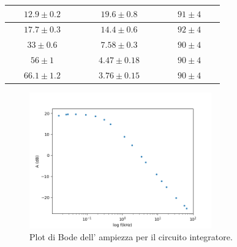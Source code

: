 \documentclass[10pt,a4paper]{article}
\newcommand{\exn}{\phantom{xxx}}
\begin{document}
\begin{table}[h]
\begin{tabular}{|c|c|c|}
				$\exn 12.9\pm 0.2 \exn $  & $\exn 19.6 \pm 0.8 \exn $ & $\exn 91 \pm  4\exn $ \\
				\hline
				$\exn 17.7\pm 0.3\exn $ & $\exn14.4\pm 0.6 \exn $ & $\exn 92\pm4\exn $ \\

				\hline
				$\exn 33\pm 0.6\exn $& $\exn7.58 \pm  0.3
   \exn $ & $\exn90 \pm 4 \exn $ \\
				\hline
				$\exn 56\pm 1 \exn $  & $\exn 4.47\pm0.18   \exn $ & $\exn 90\pm 4\exn $ \\
				
				
				\hline
				$\exn 66.1\pm 1.2\exn $ & $\exn3.76 \pm  0.15 \exn $ & $\exn90 \pm 4\exn $ \\
			
				
				\hline
				
				
				
				
			\end{tabular}
\end{table}


\begin{figure}[h]
		\begin{center}
			
			\includegraphics[width=0.7\textwidth]{bodeint}
			
	\end{center}
		\caption{\small Plot di Bode dell' ampiezza  per il circuito integratore.}
		\label{fig:bodeinte}
\end{figure}
\end{document}
